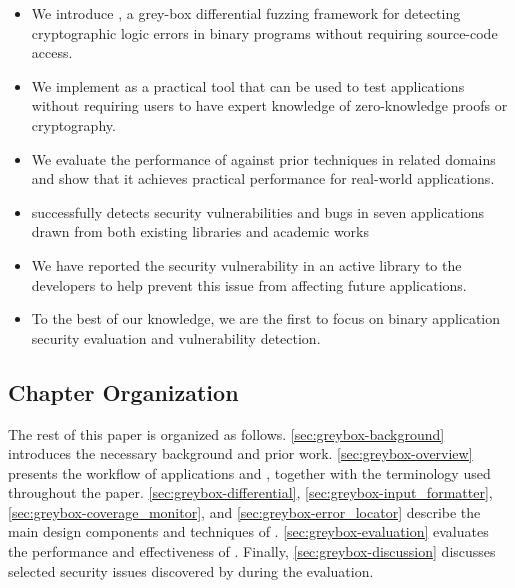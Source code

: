 \begin{itemize}
    \item We introduce \greyboxfuzz, a grey-box differential fuzzing framework for detecting cryptographic logic errors in \zksnark binary programs without requiring source-code access.

    \item We implement \greyboxfuzz as a practical tool that can be used to test \zksnark applications without requiring users to have expert knowledge of zero-knowledge proofs or cryptography.

    \item We evaluate the performance of \greyboxfuzz against prior techniques in related domains and show that it achieves practical performance for real-world \zksnark applications.

    \item \greyboxfuzz successfully detects security vulnerabilities and bugs in seven \zksnark applications drawn from both existing libraries and academic works
    
    \item We have reported the security vulnerability in an active \zksnark library \gnark to the developers to help prevent this issue from affecting future applications.
    
    \item To the best of our knowledge, we are the first to focus on binary \zksnark application security evaluation and vulnerability detection.

\end{itemize}


\subsection{Chapter Organization}
The rest of this paper is organized as follows. \autoref{sec:greybox-background} introduces the necessary background and prior work. \autoref{sec:greybox-overview} presents the workflow of \zksnark applications and \greyboxfuzz, together with the terminology used throughout the paper. \autoref{sec:greybox-differential}, \autoref{sec:greybox-input_formatter}, \autoref{sec:greybox-coverage_monitor}, and \autoref{sec:greybox-error_locator} describe the main design components and techniques of \greyboxfuzz. \autoref{sec:greybox-evaluation} evaluates the performance and effectiveness of \greyboxfuzz. Finally, \autoref{sec:greybox-discussion} discusses selected security issues discovered by \greyboxfuzz during the evaluation.


